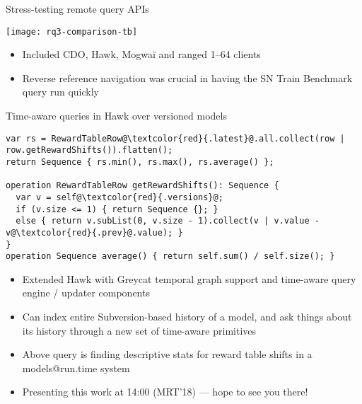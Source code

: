 \begin{frame}{Stress-testing remote query APIs~\cite{sosym-stress-2017}}

  \begin{center}
    \texttt{[image: rq3-comparison-tb]}
  \end{center}

  \begin{itemize}
  \item Included CDO, Hawk, Mogwaï and ranged 1--64 clients
  \item Reverse reference navigation was crucial in having the
    SN Train Benchmark~\cite{trainbenchmark} query run quickly
  \end{itemize}

\end{frame}

\begin{frame}[fragile]{Time-aware queries in Hawk over versioned models~\cite{hawk-mrt2018}}

  \begin{lstlisting}[frame=tb,language=EOL,escapechar=@,basicstyle=\footnotesize]
var rs = RewardTableRow@\textcolor{red}{.latest}@.all.collect(row | row.getRewardShifts()).flatten();
return Sequence { rs.min(), rs.max(), rs.average() };

operation RewardTableRow getRewardShifts(): Sequence {
  var v = self@\textcolor{red}{.versions}@;
  if (v.size <= 1) { return Sequence {}; }
  else { return v.subList(0, v.size - 1).collect(v | v.value - v@\textcolor{red}{.prev}@.value); }
}
operation Sequence average() { return self.sum() / self.size(); }
  \end{lstlisting}

  \begin{itemize}
  \item Extended Hawk with Greycat temporal graph support and time-aware query
    engine / updater components
  \item Can index entire Subversion-based history of a model, and ask things
    about its history through a new set of time-aware primitives
  \item Above query is finding descriptive stats for reward table shifts in a
    models@run.time system
  \item \alert{Presenting this work at 14:00 (MRT'18) --- hope to see you there!}
  \end{itemize}

\end{frame}

